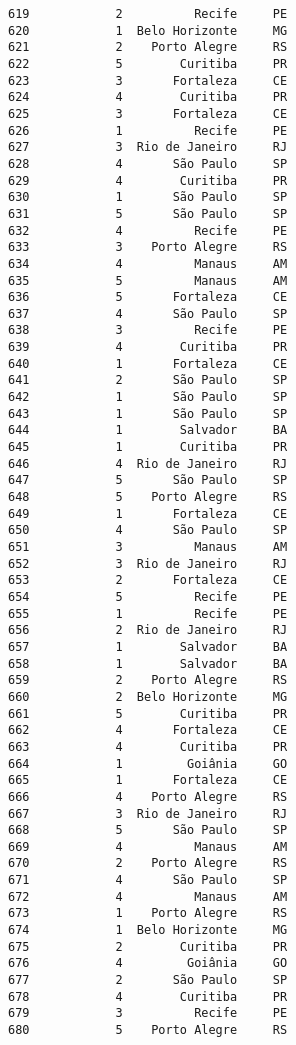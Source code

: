 \documentclass[11pt]{article}
\begin{document}
\begin{Verbatim}[commandchars=\\\{\}]
619            2          Recife     PE  
620            1  Belo Horizonte     MG  
621            2    Porto Alegre     RS  
622            5        Curitiba     PR  
623            3       Fortaleza     CE  
624            4        Curitiba     PR  
625            3       Fortaleza     CE  
626            1          Recife     PE  
627            3  Rio de Janeiro     RJ  
628            4       São Paulo     SP  
629            4        Curitiba     PR  
630            1       São Paulo     SP  
631            5       São Paulo     SP  
632            4          Recife     PE  
633            3    Porto Alegre     RS  
634            4          Manaus     AM  
635            5          Manaus     AM  
636            5       Fortaleza     CE  
637            4       São Paulo     SP  
638            3          Recife     PE  
639            4        Curitiba     PR  
640            1       Fortaleza     CE  
641            2       São Paulo     SP  
642            1       São Paulo     SP  
643            1       São Paulo     SP  
644            1        Salvador     BA  
645            1        Curitiba     PR  
646            4  Rio de Janeiro     RJ  
647            5       São Paulo     SP  
648            5    Porto Alegre     RS  
649            1       Fortaleza     CE  
650            4       São Paulo     SP  
651            3          Manaus     AM  
652            3  Rio de Janeiro     RJ  
653            2       Fortaleza     CE  
654            5          Recife     PE  
655            1          Recife     PE  
656            2  Rio de Janeiro     RJ  
657            1        Salvador     BA  
658            1        Salvador     BA  
659            2    Porto Alegre     RS  
660            2  Belo Horizonte     MG  
661            5        Curitiba     PR  
662            4       Fortaleza     CE  
663            4        Curitiba     PR  
664            1         Goiânia     GO  
665            1       Fortaleza     CE  
666            4    Porto Alegre     RS  
667            3  Rio de Janeiro     RJ  
668            5       São Paulo     SP  
669            4          Manaus     AM  
670            2    Porto Alegre     RS  
671            4       São Paulo     SP  
672            4          Manaus     AM  
673            1    Porto Alegre     RS  
674            1  Belo Horizonte     MG  
675            2        Curitiba     PR  
676            4         Goiânia     GO  
677            2       São Paulo     SP  
678            4        Curitiba     PR  
679            3          Recife     PE  
680            5    Porto Alegre     RS  

\end{Verbatim}
\end{document}
